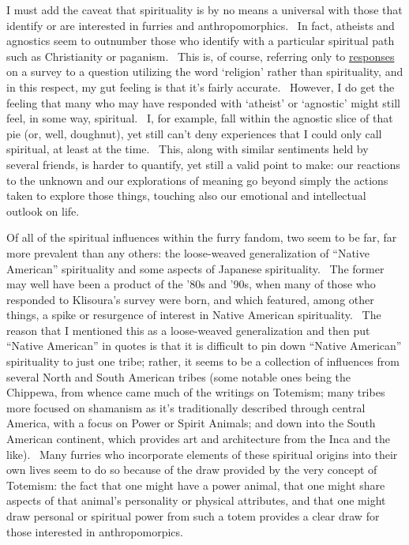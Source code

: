 I must add the caveat that spirituality is by no means a universal with
those that identify or are interested in furries and anthropomorphics.
~In fact, atheists and agnostics seem to outnumber those who identify
with a particular spiritual path such as Christianity or paganism. ~This
is, of course, referring only to
\href{http://vis.adjectivespecies.com/furrysurvey/religion.html}{responses}
on a survey to a question utilizing the word `religion' rather than
spirituality, and in this respect, my gut feeling is that it's fairly
accurate. ~However, I do get the feeling that many who may have
responded with `atheist' or `agnostic' might still feel, in some way,
spiritual. ~I, for example, fall within the agnostic slice of that pie
(or, well, doughnut), yet still can't deny experiences that I could only
call spiritual, at least at the time. ~This, along with similar
sentiments held by several friends, is harder to quantify, yet still a
valid point to make: our reactions to the unknown and our explorations
of meaning go beyond simply the actions taken to explore those things,
touching also our emotional and intellectual outlook on life.

Of all of the spiritual influences within the furry fandom, two seem to
be far, far more prevalent than any others: the loose-weaved
generalization of ``Native American'' spirituality and some aspects of
Japanese spirituality. ~The former may well have been a product of the
'80s and '90s, when many of those who responded to Klisoura's survey
were born, and which featured, among other things, a spike or resurgence
of interest in Native American spirituality. ~The reason that I
mentioned this as a loose-weaved generalization and then put ``Native
American'' in quotes is that it is difficult to pin down ``Native
American'' spirituality to just one tribe; rather, it seems to be a
collection of influences from several North and South American tribes
(some notable ones being the Chippewa, from whence came much of the
writings on Totemism; many tribes more focused on shamanism as it's
traditionally described through central America, with a focus on Power
or Spirit Animals; and down into the South American continent, which
provides art and architecture from the Inca and the like). ~Many furries
who incorporate elements of these spiritual origins into their own lives
seem to do so because of the draw provided by the very concept of
Totemism: the fact that one might have a power animal, that one might
share aspects of that animal's personality or physical attributes, and
that one might draw personal or spiritual power from such a totem
provides a clear draw for those interested in anthropomorpics.

